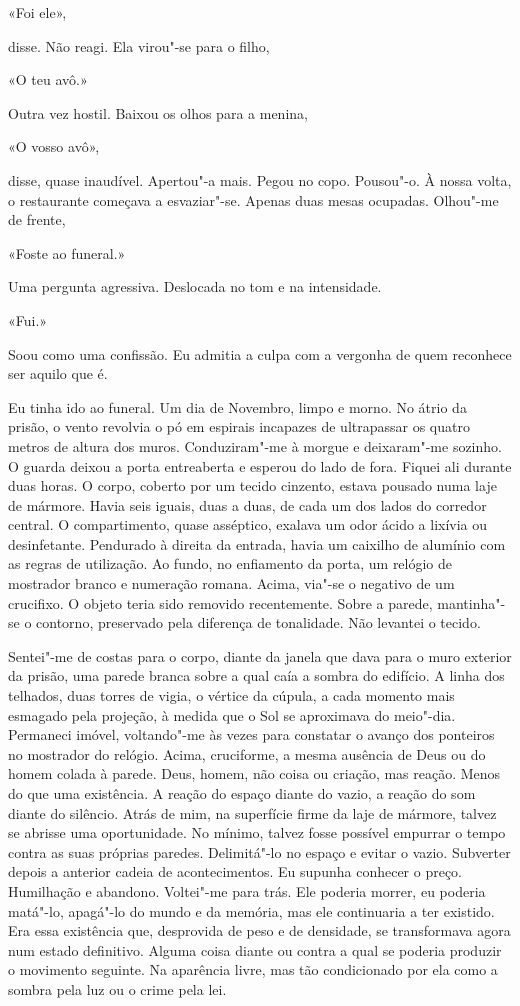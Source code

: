 «Foi ele»,

disse. Não reagi. Ela virou"-se para o filho,

«O teu avô.»

Outra vez hostil. Baixou os olhos para a menina,

«O vosso avô»,

disse, quase inaudível. Apertou"-a mais. Pegou no copo. Pousou"-o. À
nossa volta, o restaurante começava a esvaziar"-se. Apenas duas mesas
ocupadas. Olhou"-me de frente,

«Foste ao funeral.»

Uma pergunta agressiva. Deslocada no tom e na intensidade.

«Fui.»

Soou como uma confissão. Eu admitia a culpa com a vergonha de quem
reconhece ser aquilo que é.

Eu tinha ido ao funeral. Um dia de Novembro, limpo e morno. No átrio da
prisão, o vento revolvia o pó em espirais incapazes de ultrapassar os
quatro metros de altura dos muros. Conduziram"-me à morgue e
deixaram"-me sozinho. O guarda deixou a porta entreaberta e esperou do
lado de fora. Fiquei ali durante duas horas. O corpo, coberto por um
tecido cinzento, estava pousado numa laje de mármore. Havia seis iguais,
duas a duas, de cada um dos lados do corredor central. O compartimento,
quase asséptico, exalava um odor ácido a lixívia ou desinfetante.
Pendurado à direita da entrada, havia um caixilho de alumínio com as
regras de utilização. Ao fundo, no enfiamento da porta, um relógio de
mostrador branco e numeração romana. Acima, via"-se o negativo de um
crucifixo. O objeto teria sido removido recentemente. Sobre a parede,
mantinha"-se o contorno, preservado pela diferença de tonalidade. Não
levantei o tecido.

Sentei"-me de costas para o corpo, diante da janela que dava para o muro
exterior da prisão, uma parede branca sobre a qual caía a sombra do
edifício. A linha dos telhados, duas torres de vigia, o vértice da
cúpula, a cada momento mais esmagado pela projeção, à medida que o Sol
se aproximava do meio"-dia. Permaneci imóvel, voltando"-me às vezes para
constatar o avanço dos ponteiros no mostrador do relógio. Acima,
cruciforme, a mesma ausência de Deus ou do homem colada à parede. Deus,
homem, não coisa ou criação, mas reação. Menos do que uma existência. A
reação do espaço diante do vazio, a reação do som diante do silêncio.
Atrás de mim, na superfície firme da laje de mármore, talvez se abrisse
uma oportunidade. No mínimo, talvez fosse possível empurrar o tempo
contra as suas próprias paredes. Delimitá"-lo no espaço e evitar o
vazio. Subverter depois a anterior cadeia de acontecimentos. Eu supunha
conhecer o preço. Humilhação e abandono. Voltei"-me para trás. Ele
poderia morrer, eu poderia matá"-lo, apagá"-lo do mundo e da memória,
mas ele continuaria a ter existido. Era essa existência que, desprovida
de peso e de densidade, se transformava agora num estado definitivo.
Alguma coisa diante ou contra a qual se poderia produzir o movimento
seguinte. Na aparência livre, mas tão condicionado por ela como a sombra
pela luz ou o crime pela lei.

